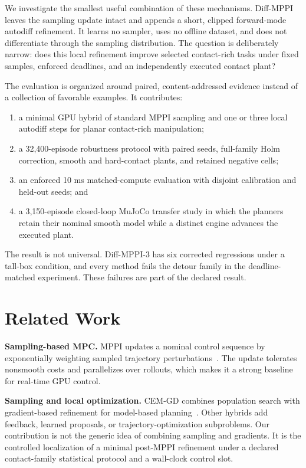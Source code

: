 \documentclass[conference]{IEEEtran}
\begin{document}
We investigate the smallest useful combination of these mechanisms.
Diff-MPPI leaves the sampling update intact and appends a short, clipped
forward-mode autodiff refinement.  It learns no sampler, uses no offline
dataset, and does not differentiate through the sampling distribution.  The
question is deliberately narrow: does this local refinement improve selected
contact-rich tasks under fixed samples, enforced deadlines, and an
independently executed contact plant?

The evaluation is organized around paired, content-addressed evidence instead
of a collection of favorable examples.  It contributes:

\begin{enumerate}
  \item a minimal GPU hybrid of standard MPPI sampling and one or three local
  autodiff steps for planar contact-rich manipulation;
  \item a 32,400-episode robustness protocol with paired seeds, full-family
  Holm correction, smooth and hard-contact plants, and retained negative
  cells;
  \item an enforced 10 ms matched-compute evaluation with disjoint calibration
  and held-out seeds; and
  \item a 3,150-episode closed-loop MuJoCo transfer study in which the planners
  retain their nominal smooth model while a distinct engine advances the
  executed plant.
\end{enumerate}

The result is not universal.  Diff-MPPI-3 has six corrected regressions under
a tall-box condition, and every method fails the detour family in the
deadline-matched experiment.  These failures are part of the declared result.

\section{Related Work}

\textbf{Sampling-based MPC.}
MPPI updates a nominal control sequence by exponentially weighting sampled
trajectory perturbations~\cite{williams2017mppi}.  The update tolerates
nonsmooth costs and parallelizes over rollouts, which makes it a strong
baseline for real-time GPU control.

\textbf{Sampling and local optimization.}
CEM-GD combines population search with gradient-based refinement for
model-based planning~\cite{bharadhwaj2020cemgd}.  Other hybrids add feedback,
learned proposals, or trajectory-optimization subproblems.  Our contribution
is not the generic idea of combining sampling and gradients.  It is the
controlled localization of a minimal post-MPPI refinement under a declared
contact-family statistical protocol and a wall-clock control slot.
\end{document}
